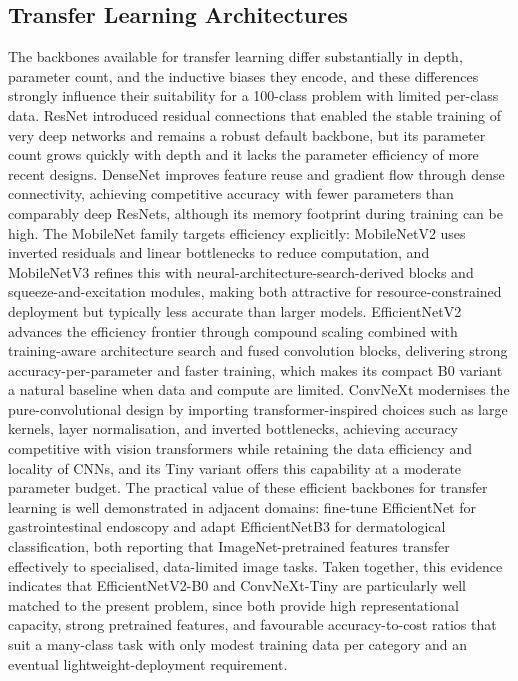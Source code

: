 \subsection{Transfer Learning Architectures}
\label{subsec:transferarch}

The backbones available for transfer learning differ substantially in depth, parameter count, and the inductive biases they encode, and these differences strongly influence their suitability for a 100-class problem with limited per-class data.
ResNet \citep{he2016resnet} introduced residual connections that enabled the stable training of very deep networks and remains a robust default backbone, but its parameter count grows quickly with depth and it lacks the parameter efficiency of more recent designs.
DenseNet \citep{huang2017densenet} improves feature reuse and gradient flow through dense connectivity, achieving competitive accuracy with fewer parameters than comparably deep ResNets, although its memory footprint during training can be high.
The MobileNet family targets efficiency explicitly: MobileNetV2 \citep{sandler2018mobilenetv2} uses inverted residuals and linear bottlenecks to reduce computation, and MobileNetV3 \citep{howard2019mobilenetv3} refines this with neural-architecture-search-derived blocks and squeeze-and-excitation modules, making both attractive for resource-constrained deployment but typically less accurate than larger models.
EfficientNetV2 \citep{tan2021efficientnetv2} advances the efficiency frontier through compound scaling combined with training-aware architecture search and fused convolution blocks, delivering strong accuracy-per-parameter and faster training, which makes its compact B0 variant a natural baseline when data and compute are limited.
ConvNeXt \citep{liu2022convnext} modernises the pure-convolutional design by importing transformer-inspired choices such as large kernels, layer normalisation, and inverted bottlenecks, achieving accuracy competitive with vision transformers while retaining the data efficiency and locality of CNNs, and its Tiny variant offers this capability at a moderate parameter budget.
The practical value of these efficient backbones for transfer learning is well demonstrated in adjacent domains: \citet{alotaibi2024gastro} fine-tune EfficientNet for gastrointestinal endoscopy and \citet{manole2024dermatology} adapt EfficientNetB3 for dermatological classification, both reporting that ImageNet-pretrained features transfer effectively to specialised, data-limited image tasks.
Taken together, this evidence indicates that EfficientNetV2-B0 and ConvNeXt-Tiny are particularly well matched to the present problem, since both provide high representational capacity, strong pretrained features, and favourable accuracy-to-cost ratios that suit a many-class task with only modest training data per category and an eventual lightweight-deployment requirement.

